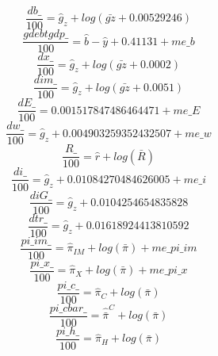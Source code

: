 \begin{dmath}
\frac{{db\_}}{100}={\hat{g}_z}+log\left({\bar{gz}}+0.00529246\right)
\end{dmath}
\begin{dmath}
\frac{{gdebtgdp\_}}{100}={\hat{b}}-{\hat{y}}+0.41131+{me\_b}
\end{dmath}
\begin{dmath}
\frac{{dx\_}}{100}={\hat{g}_z}+log\left({\bar{gz}}+0.0002\right)
\end{dmath}
\begin{dmath}
\frac{{dim\_}}{100}={\hat{g}_z}+log\left({\bar{gz}}+0.0051\right)
\end{dmath}
\begin{dmath}
\frac{{dE\_}}{100}=0.001517847486464471+{me\_E}
\end{dmath}
\begin{dmath}
\frac{{dw\_}}{100}={\hat{g}_z}+0.004903259352432507+{me\_w}
\end{dmath}
\begin{dmath}
\frac{{R\_}}{100}={\hat{r}}+log\left({\bar{R}}\right)
\end{dmath}
\begin{dmath}
\frac{{di\_}}{100}={\hat{g}_z}+0.01084270484626005+{me\_i}
\end{dmath}
\begin{dmath}
\frac{{diG\_}}{100}={\hat{g}_z}+0.0104254654835828
\end{dmath}
\begin{dmath}
\frac{{dtr\_}}{100}={\hat{g}_z}+0.01618924413810592
\end{dmath}
\begin{dmath}
\frac{{pi\_im\_}}{100}={\hat{\pi}_{IM}}+log\left({\bar{\pi}}\right)+{me\_pi\_im}
\end{dmath}
\begin{dmath}
\frac{{pi\_x\_}}{100}={\hat{\pi}_{X}}+log\left({\bar{\pi}}\right)+{me\_pi\_x}
\end{dmath}
\begin{dmath}
\frac{{pi\_c\_}}{100}={\hat{\pi}_{C}}+log\left({\bar{\pi}}\right)
\end{dmath}
\begin{dmath}
\frac{{pi\_cbar\_}}{100}={\hat{\bar{\pi}}^C}+log\left({\bar{\pi}}\right)
\end{dmath}
\begin{dmath}
\frac{{pi\_h\_}}{100}={\hat{\pi}_{H}}+log\left({\bar{\pi}}\right)
\end{dmath}
